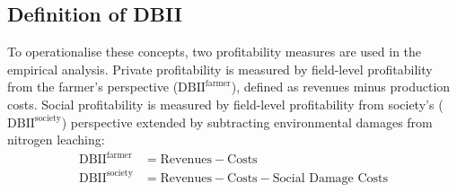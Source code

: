 \documentclass[12pt]{article}
\begin{document}



\subsection{Definition of DBII}
\label{sec:dbii-definition}

To operationalise these concepts, two profitability measures are used in the empirical analysis. Private profitability is measured by field-level profitability from the farmer's perspective ($\mathrm{DBII^{farmer}}$), defined as revenues minus production costs. 
Social profitability is measured by field-level profitability from society's ($\mathrm{DBII^{society}}$) perspective extended by subtracting environmental damages from nitrogen leaching:
\begin{equation}
\begin{aligned}
    \label{eq:def-dbii}
    \text{DBII}^{\text{farmer}} &= \text{Revenues} - \text{Costs} \\
    \text{DBII}^{\text{society}} &= \text{Revenues} - \text{Costs} - \text{Social Damage Costs}
\end{aligned}
\end{equation}
\end{document}
